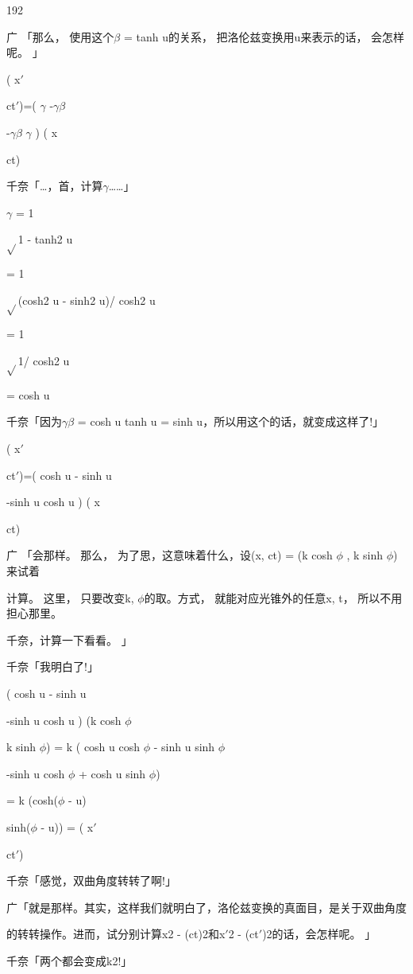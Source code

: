 192\par
广 「那么， 使用这个$\beta$ = tanh u的关系， 把洛伦兹变换用u来表示的话， 会怎样呢。 」\par
( x$\prime$\par
ct$\prime$)=( $\gamma$ -$\gamma$$\beta$\par
-$\gamma$$\beta$ $\gamma$ ) ( x\par
ct)\par
千奈「…，首，计算$\gamma$……」\par
$\gamma$ = 1\par
$\sqrt{}$1 - tanh2 u\par
= 1\par
$\sqrt{}$(cosh2 u - sinh2 u)/ cosh2 u\par
= 1\par
$\sqrt{}$1/ cosh2 u\par
= cosh u\par
千奈「因为$\gamma$$\beta$ = cosh u tanh u = sinh u，所以用这个的话，就变成这样了!」\par
( x$\prime$\par
ct$\prime$)=( cosh u - sinh u\par
-sinh u cosh u ) ( x\par
ct)\par
广 「会那样。 那么， 为了思，这意味着什么，设(x, ct) = (k cosh $\phi$ , k sinh $\phi$)来试着\par
计算。 这里， 只要改变k, $\phi$的取。方式， 就能对应光锥外的任意x, t， 所以不用担心那里。\par
千奈，计算一下看看。 」\par
千奈「我明白了!」\par
( cosh u - sinh u\par
-sinh u cosh u ) (k cosh $\phi$\par
k sinh $\phi$) = k ( cosh u cosh $\phi$ - sinh u sinh $\phi$\par
-sinh u cosh $\phi$ + cosh u sinh $\phi$)\par
= k (cosh($\phi$ - u)\par
sinh($\phi$ - u)) = ( x$\prime$\par
ct$\prime$)\par
千奈「感觉，双曲角度转转了啊!」\par
广「就是那样。其实，这样我们就明白了，洛伦兹变换的真面目，是关于双曲角度\par
的转转操作。进而，试分别计算x2 - (ct)2和x$\prime$2 - (ct$\prime$)2的话，会怎样呢。 」\par
千奈「两个都会变成k2!」\par

